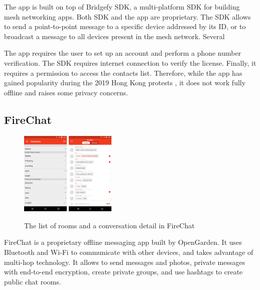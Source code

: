 \documentclass[conference,compsoc]{IEEEtran}
\begin{document}
The app is built on top of Bridgefy SDK, a multi-platform SDK for building mesh networking apps. Both SDK and the app are proprietary. The SDK allows to send a point-to-point message to a specific device addressed by its ID, or to broadcast a message to all devices present in the mesh network. Several

The app requires the user to set up an account and perform a phone number verification. The SDK requires internet connection to verify the license. Finally, it requires a permission to access the contacts list. Therefore, while the app has gained popularity during the 2019 Hong Kong protests \cite{forbes:hk}, it does not work fully offline and raises some privacy concerns.

\subsection{FireChat}

\begin{figure}[h]
  \centering
  \includegraphics[width=0.2\textwidth]{firechat1}
  \includegraphics[width=0.2\textwidth]{firechat2}
  \caption{The list of rooms and a conversation detail in FireChat \cite{firechat}}
\end{figure}

FireChat \cite{firechat} is a proprietary offline messaging app built by OpenGarden. It uses Bluetooth and Wi-Fi to communicate with other devices, and takes advantage of multi-hop technology. It allows to send messages and photos, private messages with end-to-end encryption, create private groups, and use hashtags to create public chat rooms.
\end{document}
